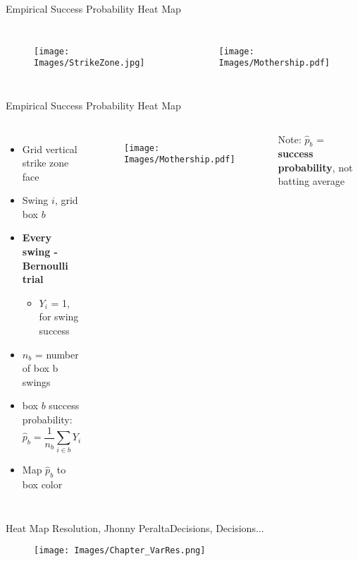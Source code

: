 \documentclass{beamer}
\begin{document}
\begin{frame}{Empirical Success Probability Heat Map} %
\begin{columns}


  \begin{figure}[H]
	\centering
	\texttt{[image: Images/StrikeZone.jpg]}
	\end{figure}

  \begin{figure}[H]
	\centering
	\texttt{[image: Images/Mothership.pdf]}
	\end{figure}
	
\end{columns}
\end{frame}

\begin{frame}{Empirical Success Probability Heat Map} %
\begin{columns}


\begin{itemize}
\item Grid vertical strike zone face
\item Swing $i$, grid box $b$
\item {\bf Every swing - Bernoulli trial}
  \begin{itemize}
  \item $Y_{i}$ = 1, for swing success
  \end{itemize}
\item $n_{b}$ = number of box b swings
\item box $b$ success probability:
$$\hat{p}_{b} = \frac{1}{n_{b}} \sum_{i \in b} Y_{i}$$ 
\item Map $\hat{p}_{b}$ to box color
\end{itemize}

  \begin{figure}[H]
	\centering
	\texttt{[image: Images/Mothership.pdf]}
	\end{figure}
Note: $\hat{p}_{b}$ = {\bf success probability}, not batting average
\end{columns}
\end{frame}

\begin{frame}{Heat Map Resolution, Jhonny Peralta}{Decisions, Decisions...}

  \begin{figure}[H]
	\texttt{[image: Images/Chapter\_VarRes.png]}
	\end{figure}

\end{frame}
\end{document}
